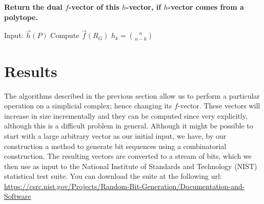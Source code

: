 \documentclass[oneside,12pt]{amsart}
\theoremstyle{definition}
\numberwithin{equation}{section}
\begin{document}
\vspace{.5in}

\begin{center}
\textbf{Return the dual $f$-vector of this $h$-vector, if $h$-vector comes from a polytope.}
\end{center}

\vspace{.1in}


\begin{algorithmic}
\State Input: $\overrightarrow{h}(P)$
\State Compute $\overrightarrow{f}(R_G)$
\State    $h_k = {n \choose n-k}$
\Else
{}%
\EndIf
\EndFor
\EndFor
\end{algorithmic}




\newpage
\section{Results} \label{results}



\sloppy
The algorithms described in the previous section allow us to perform a particular operation on a simplicial complex; hence changing its $f$-vector.  These vectors will increase in size incrementally and they can be computed since very explicitly, although this is a difficult problem in general.  Although it might be possible to start with a large arbitrary vector as our initial input, we have, by our construction a method to generate bit sequences using a combinatorial construction.  The resulting vectors are converted to a stream of bits, which we then use as input to the National Institute of Standards and Technology (NIST) statistical test suite. You can download the suite at the following url:  \url{https://csrc.nist.gov/Projects/Random-Bit-Generation/Documentation-and-Software}
\end{document}
